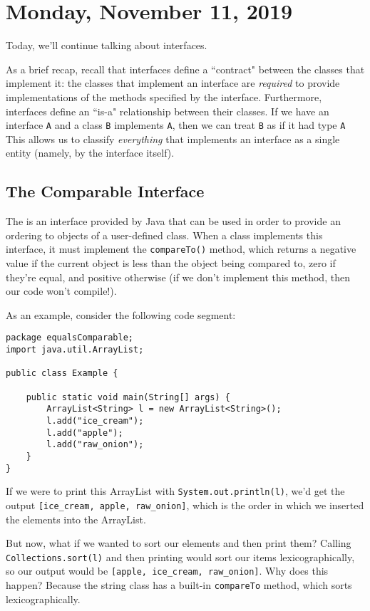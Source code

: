 \section{Monday, November 11, 2019}


Today, we'll continue talking about interfaces.

As a brief recap, recall that interfaces define a ``contract" between the classes that implement it: the classes that implement an interface are \textit{required} to provide implementations of the methods specified by the interface. Furthermore, interfaces define an ``is-a" relationship between their classes. If we have an interface \verb!A! and a class \verb!B! implements \verb!A!, then we can treat \verb!B! as if it had type \verb!A! This allows us to classify \textit{everything} that implements an interface as a single entity (namely, by the interface itself).


\subsection{The Comparable Interface}

The  is an interface provided by Java that can be used in order to provide an ordering to objects of a user-defined class. When a class implements this interface, it must implement the \verb!compareTo()! method, which returns a negative value if the current object is less than the object being compared to, zero if they're equal, and positive otherwise (if we don't implement this method, then our code won't compile!).

As an example, consider the following code segment:

\begin{lstlisting}
package equalsComparable;
import java.util.ArrayList;

public class Example {

    public static void main(String[] args) {
        ArrayList<String> l = new ArrayList<String>();
        l.add("ice_cream");
        l.add("apple");
        l.add("raw_onion");
    }
}
\end{lstlisting}


If we were to print this ArrayList with \verb!System.out.println(l)!, we'd get the output \verb![ice_cream, apple, raw_onion]!, which is the order in which we inserted the elements into the ArrayList.


But now, what if we wanted to sort our elements and then print them? Calling \verb!Collections.sort(l)! and then printing would sort our items lexicographically, so our output would be \verb![apple, ice_cream, raw_onion]!. Why does this happen? Because the string class has a built-in \verb!compareTo! method, which sorts lexicographically. 


